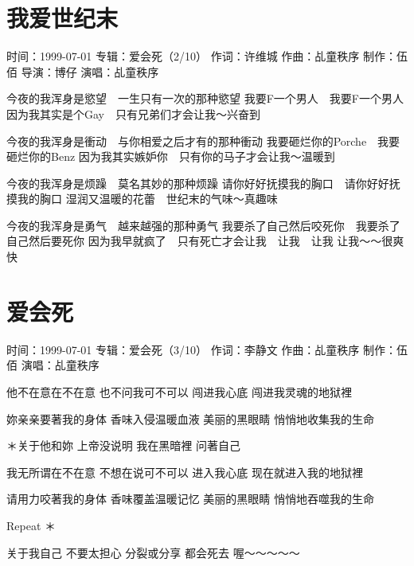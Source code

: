 \documentclass[UTF8,a4paper,oneside,twocolumn,12pt]{ctexbook}
\newcommand{\infopair}[2]{\textbullet #1：#2}
\newcommand{\zc}[1][伍佰]{\infopair{作词}{#1}}
\newcommand{\zq}[1][伍佰]{\infopair{作曲}{#1}}
\newcommand{\zj}[1]{\infopair{专辑}{#1}}
\newcommand{\zz}[1]{\infopair{制作}{#1}}
\newcommand{\sj}[1]{\infopair{时间}{#1}}
\newenvironment{info}{\begin{flushleft}\kaishu
	}
	{\end{flushleft}\normalsize\yahei\par}
\newenvironment{lyric}{
	}
{}
\begin{document}
\section{我爱世纪末}
\begin{info}
	\sj{1999-07-01}
	\zj{爱会死（2/10）}
	\zc[许维城]
	\zq[乩童秩序]
	\zz{伍佰}
	\infopair{导演}{博仔}
	\infopair{演唱}{乩童秩序}
\end{info}
\begin{lyric}
	今夜的我浑身是慾望　一生只有一次的那种慾望
	我要F一个男人　我要F一个男人
	因为我其实是个Gay　只有兄弟们才会让我～兴奋到

	今夜的我浑身是衝动　与你相爱之后才有的那种衝动
	我要砸烂你的Porche　我要砸烂你的Benz
	因为我其实嫉妒你　只有你的马子才会让我～温暖到

	今夜的我浑身是烦躁　莫名其妙的那种烦躁
	请你好好抚摸我的胸口　请你好好抚摸我的胸口
	湿润又温暖的花蕾　世纪末的气味～真趣味

	今夜的我浑身是勇气　越来越强的那种勇气
	我要杀了自己然后咬死你　我要杀了自己然后要死你
	因为我早就疯了　只有死亡才会让我　让我　让我
	让我～～很爽快
\end{lyric}

\section{爱会死}
\begin{info}
	\sj{1999-07-01}
	\zj{爱会死（3/10）}
	\zc[李静文]
	\zq[乩童秩序]
	\zz{伍佰}
	\infopair{演唱}{乩童秩序}
\end{info}
\begin{lyric}
	他不在意在不在意
	也不问我可不可以
	闯进我心底
	闯进我灵魂的地狱裡

	妳亲亲要著我的身体
	香味入侵温暖血液
	美丽的黑眼睛
	悄悄地收集我的生命

	＊关于他和妳
	上帝没说明
	我在黑暗裡
	问著自己

	我无所谓在不在意
	不想在说可不可以
	进入我心底
	现在就进入我的地狱裡

	请用力咬著我的身体
	香味覆盖温暖记忆
	美丽的黑眼睛
	悄悄地吞噬我的生命

	Repeat ＊

	关于我自己
	不要太担心
	分裂或分享
	都会死去
	喔～～～～～
\end{lyric}
\end{document}

